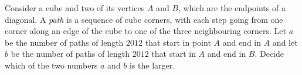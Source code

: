Consider a cube and two of its vertices $A$ and $B$, which are the endpoints of a diagonal.
A \emph{path} is a sequence of cube corners, with each step going from one corner along an edge of the
cube to one of the three neighbouring corners.
Let $a$ be the number of paths of length $2012$ that start in point $A$ and end in $A$ and
let $b$ be the number of paths of length $2012$ that start in $A$ and end in $B$.
Decide which of the two numbers $a$ and $b$ is the larger.
